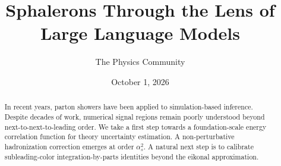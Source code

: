 \documentclass[11pt]{article}
\title{Sphalerons Through the Lens of Large Language Models}
\author{The Physics Community}
\date{October 1, 2026}
\numberwithin{equation}{section}
\theoremstyle{definition}
\theoremstyle{remark}
\begin{document}
\maketitle
\begin{abstract}
In recent years, parton showers have been applied to simulation-based
inference. Despite decades of work, numerical signal regions remain
poorly understood beyond next-to-next-to-leading order. We take a first
step towards a foundation-scale energy correlation function for theory
uncertainty estimation. A non-perturbative hadronization correction
emerges at order $\alpha_s^2$. A natural next step is to calibrate
subleading-color integration-by-parts identities beyond the eikonal
approximation.
\end{abstract}
\tableofcontents



\nocite{*}


\end{document}
